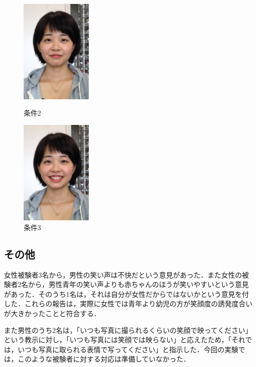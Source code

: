 \documentclass[submit,techreq]{ec2014}
\begin{document}
\begin{figure}[h]
\begin{minipage}{0.49\columnwidth}
\begin{center}
\includegraphics[width=35mm, bb=0 0 572 834]{images/cap_28.jpg}
\caption{条件2}
\end{center}
\end{minipage}
\begin{minipage}{0.49\columnwidth}
\begin{center}
\includegraphics[width=35mm, bb=0 0 572 834]{images/cap_123.jpg}
\caption{条件3}
\end{center}
\end{minipage}
\end{figure}


\subsection{その他}

女性被験者3名から，男性の笑い声は不快だという意見があった．また女性の被験者2名から，男性青年の笑い声よりも赤ちゃんのほうが笑いやすいという意見があった．そのうち1名は，それは自分が女性だからではないかという意見を付した．これらの報告は，実際に女性では青年より幼児の方が笑顔度の誘発度合いが大きかったことと符合する．

また男性のうち2名は，「いつも写真に撮られるくらいの笑顔で映ってください」という教示に対し，「いつも写真には笑顔では映らない」と応えたため，「それでは，いつも写真に取られる表情で写ってください」と指示した．今回の実験では，このような被験者に対する対応は準備していなかった．
\end{document}
